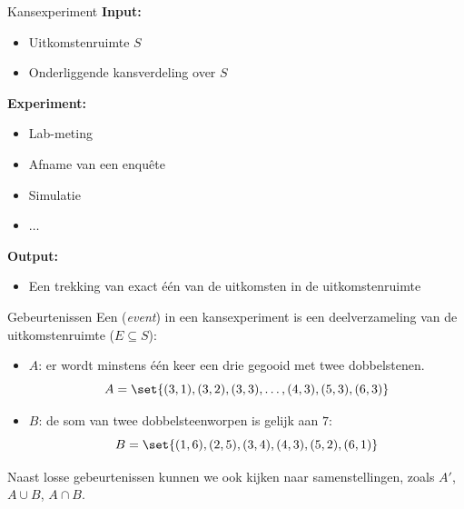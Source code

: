     \begin{frame}{Kansexperiment}
        \textbf{Input:} \medskip

        \begin{itemize}
            \item Uitkomstenruimte $S$
            \item Onderliggende kansverdeling over $S$
        \end{itemize}\medskip

        \textbf{Experiment:} \medskip

        \begin{itemize}
            \item Lab-meting
            \item Afname van een enquête
            \item Simulatie
            \item $\ldots$
        \end{itemize}\medskip

        \textbf{Output:} \medskip

        \begin{itemize}
            \item Een trekking van exact één van de uitkomsten in de uitkomstenruimte
        \end{itemize}
    \end{frame}

    \begin{frame}{Gebeurtenissen}
        Een  (\emph{event}) in een kansexperiment is een deelverzameling van de uitkomstenruimte ($E \subseteq S$):
        \begin{itemize}
            \item $A$: er wordt minstens één keer een drie gegooid met twee dobbelstenen.
            \[
                A = \set{(3,1), (3,2), (3,3), \ldots, (4, 3), (5, 3), (6, 3)}
            \]
            \item $B$: de som van twee dobbelsteenworpen is gelijk aan $7$:
            \[
                B = \set{(1,6), (2,5), (3,4), (4,3), (5,2), (6,1)}
            \]
        \end{itemize}
        Naast losse gebeurtenissen kunnen we ook kijken naar samenstellingen, zoals $A'$, $A \cup B$, $A \cap B$.
    \end{frame}


